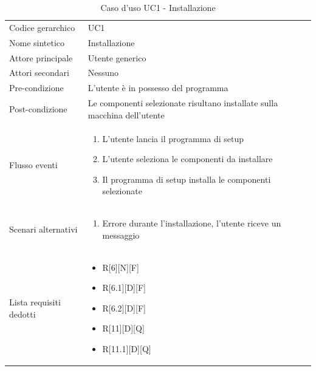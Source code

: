 \documentclass[a4paper]{report}
\begin{document}
			\begin{table}[H]
			\begin{tabularx}{\textwidth}{X | X}\toprule
				\rowcolor{orange!65}Codice gerarchico & UC1 \\
				Nome sintetico & Installazione \\
				\rowcolor{orange!65}Attore principale & Utente generico\\
				Attori secondari & Nessuno \\
				\rowcolor{orange!65}Pre-condizione & L'utente è in possesso del programma \\
				Post-condizione & Le componenti selezionate risultano installate sulla
				 macchina dell'utente \\
				\rowcolor{orange!65}Flusso eventi & \begin{enumerate}
				\item L'utente lancia il programma di setup
				\item L'utente seleziona le componenti da installare
				\item Il programma di setup installa le componenti selezionate
				\end{enumerate} \\
				Scenari alternativi & \begin{enumerate}
				\item Errore durante l'installazione, l'utente riceve un messaggio
				\end{enumerate} \\
				\rowcolor{orange!65}Lista requisiti dedotti & \begin{itemize}
				\item R[6][N][F]
				\item R[6.1][D][F]
				\item R[6.2][D][F] 
				\item R[11][D][Q]
				\item R[11.1][D][Q]
				\end{itemize} \\
				\bottomrule
			\end{tabularx}
			\caption{Caso d'uso UC1 - Installazione}
		 \end{table}
\end{document}
